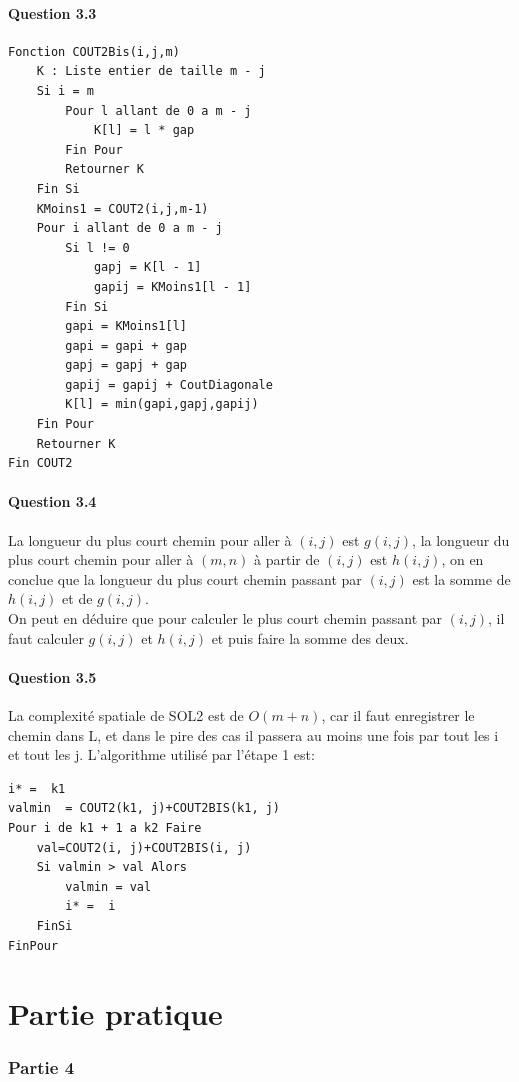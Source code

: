 \documentclass[5pt,a4paper]{report}
\begin{document}
	\subsection*{Question 3.3}
	\begin{lstlisting}
Fonction COUT2Bis(i,j,m)
	K : Liste entier de taille m - j
	Si i = m
		Pour l allant de 0 a m - j
			K[l] = l * gap
		Fin Pour
		Retourner K
	Fin Si
	KMoins1 = COUT2(i,j,m-1)
	Pour i allant de 0 a m - j
		Si l != 0
			gapj = K[l - 1]
			gapij = KMoins1[l - 1]
		Fin Si
		gapi = KMoins1[l]
		gapi = gapi + gap
		gapj = gapj + gap
		gapij = gapij + CoutDiagonale
		K[l] = min(gapi,gapj,gapij)
	Fin Pour
	Retourner K
Fin COUT2
	\end{lstlisting}
	
	\subsection*{Question 3.4}
	La longueur du plus court chemin pour aller à $(i,j)$ est $g(i,j)$, la longueur du plus court chemin pour aller à $(m,n)$ à partir de $(i,j)$ est $h(i,j)$, on en conclue que la longueur du plus court chemin passant par $(i,j)$ est la somme de $h(i,j)$ et de $g(i,j)$.\\
	On peut en déduire que pour calculer le plus court chemin passant par $(i,j)$, il faut calculer $g(i,j)$ et $h(i,j)$ et puis faire la somme des deux.
	
	\subsection*{Question 3.5}
	La complexité spatiale de SOL2 est de $O(m+n)$, car il faut enregistrer le chemin dans L, et dans le pire des cas il passera au moins une fois par tout les i et tout les j.
	L'algorithme utilisé par l'étape 1 est:
	\begin{lstlisting}
i* =  k1
valmin  = COUT2(k1, j)+COUT2BIS(k1, j)
Pour i de k1 + 1 a k2 Faire
	val=COUT2(i, j)+COUT2BIS(i, j)
	Si valmin > val Alors
		valmin = val
		i* =  i
	FinSi
FinPour
	\end{lstlisting}
\part{Partie pratique}

\section*{Partie 4}
\end{document}
